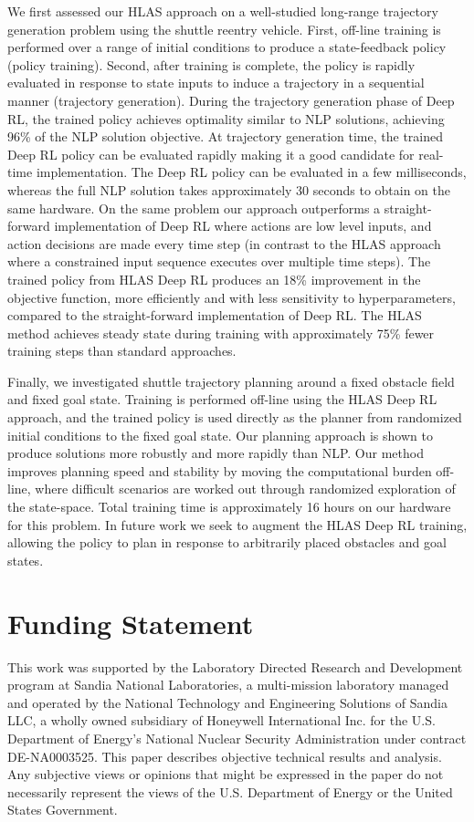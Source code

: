 \documentclass{UnderReview}
\begin{document}
We first assessed our HLAS approach on a well-studied long-range trajectory generation problem using the shuttle reentry vehicle.  First, off-line training is performed over a range of initial conditions to produce a state-feedback policy (policy training).  Second, after training is complete, the policy is rapidly evaluated in response to state inputs to induce a trajectory in a sequential manner (trajectory generation).  During the trajectory generation phase of Deep RL, the trained policy achieves optimality similar to NLP solutions, achieving 96\% of the NLP solution objective.  At trajectory generation time, the trained Deep RL policy can be evaluated rapidly making it a good candidate for real-time implementation.  The Deep RL policy can be evaluated in a few milliseconds, whereas the full NLP solution takes approximately 30 seconds to obtain on the same hardware.  
On the same problem our approach outperforms a straight-forward implementation of Deep RL where actions are low level inputs, and action decisions are made every time step (in contrast to the HLAS approach where a constrained input sequence executes over multiple time steps).  The trained policy from HLAS Deep RL produces an 18\% improvement in the objective function, more efficiently and with less sensitivity to hyperparameters, compared to the straight-forward implementation of Deep RL.  The HLAS method achieves steady state during training with approximately 75\% fewer training steps than standard approaches.


Finally, we investigated shuttle trajectory planning around a fixed obstacle field and fixed goal state.  Training is performed off-line using the HLAS Deep RL approach, and the trained policy is used directly as the planner from randomized initial conditions to the fixed goal state.  Our planning approach is shown to produce solutions more robustly and more rapidly than NLP. Our method improves planning speed and stability by moving the computational burden off-line, where difficult scenarios are worked out through randomized exploration of the state-space.  Total training time is approximately 16 hours on our hardware for this problem.  In future work we seek to augment the HLAS Deep RL training, allowing the policy to plan in response to arbitrarily placed obstacles and goal states.  



\section*{Funding Statement}
This work was supported by the Laboratory Directed Research and Development program at Sandia National Laboratories, a multi-mission laboratory managed and operated by the National Technology and Engineering Solutions of Sandia LLC, a wholly owned subsidiary of Honeywell International Inc. for the U.S. Department of Energy’s National Nuclear Security Administration under contract DE-NA0003525. This paper describes objective technical results and analysis. Any subjective views or opinions that might be expressed in the paper do not necessarily represent the views of the U.S. Department of Energy or the United States Government.
\end{document}
